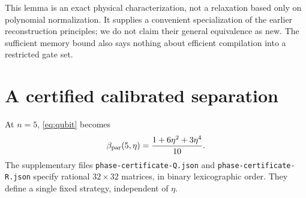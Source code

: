 \documentclass[11pt,a4paper]{article}
\theoremstyle{remark}
\begin{document}
This lemma is an exact physical characterization, not a relaxation
based only on polynomial normalization. It supplies a convenient
specialization of the earlier reconstruction principles; we do not
claim their general equivalence as new. The sufficient memory bound
also says nothing about efficient compilation into a restricted gate set.

\section{A certified calibrated separation}

At \(n=5\), \eqref{eq:qubit} becomes
\begin{equation}\label{eq:fivepar}
 \beta_{\rm par}(5,\eta)=\frac{1+6\eta^2+3\eta^4}{10}.
\end{equation}
The supplementary files \texttt{phase-certificate-Q.json} and
\texttt{phase-certificate-R.json} specify rational \(32\times32\)
matrices, in binary lexicographic order. They define a single fixed
strategy, independent of \(\eta\).
\end{document}
